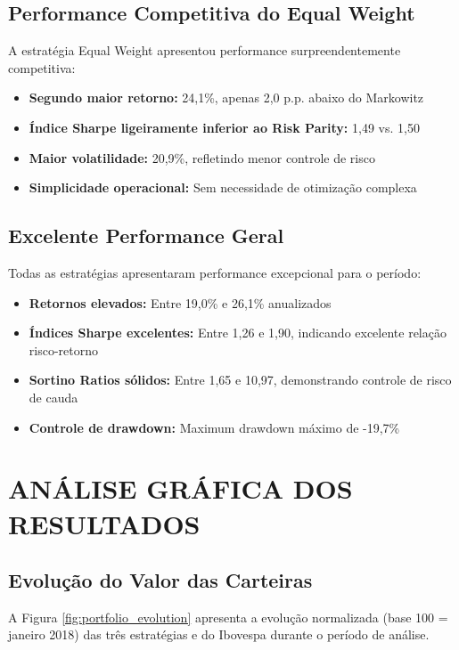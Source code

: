 \subsection{Performance Competitiva do Equal Weight}

A estratégia Equal Weight apresentou performance surpreendentemente competitiva:

\begin{itemize}
    \item \textbf{Segundo maior retorno:} 24,1\%, apenas 2,0 p.p. abaixo do Markowitz
    \item \textbf{Índice Sharpe ligeiramente inferior ao Risk Parity:} 1,49 vs. 1,50
    \item \textbf{Maior volatilidade:} 20,9\%, refletindo menor controle de risco
    \item \textbf{Simplicidade operacional:} Sem necessidade de otimização complexa
\end{itemize}

\subsection{Excelente Performance Geral}

Todas as estratégias apresentaram performance excepcional para o período:

\begin{itemize}
    \item \textbf{Retornos elevados:} Entre 19,0\% e 26,1\% anualizados
    \item \textbf{Índices Sharpe excelentes:} Entre 1,26 e 1,90, indicando excelente relação risco-retorno  
    \item \textbf{Sortino Ratios sólidos:} Entre 1,65 e 10,97, demonstrando controle de risco de cauda
    \item \textbf{Controle de drawdown:} Maximum drawdown máximo de -19,7\%
\end{itemize}

\section{ANÁLISE GRÁFICA DOS RESULTADOS}

\subsection{Evolução do Valor das Carteiras}

A Figura \ref{fig:portfolio_evolution} apresenta a evolução normalizada (base 100 = janeiro 2018) das três estratégias e do Ibovespa durante o período de análise.


